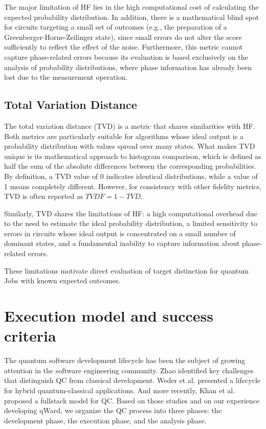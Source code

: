 \documentclass[10pt,conference]{IEEEtran}
\begin{document}
The major limitation of HF \cite{mohapatraBenchmarkingFidelityMetrics_2025} lies in the high computational cost of calculating the expected probability distribution. In addition, there is a mathematical blind spot for circuits targeting a small set of outcomes (e.g., the preparation of a Greenberger-Horne-Zeilinger state), since small errors do not alter the score sufficiently to reflect the effect of the noise. Furthermore, this metric cannot capture phase-related errors because its evaluation is based exclusively on the analysis of probability distributions, where phase information has already been lost due to the measurement operation.

\subsection{Total Variation Distance}

The total variation distance (TVD) \cite{knillBoundsApproximationTotal_1995, bhattacharyyaApproximatingTotalVariation_2023} is a metric that shares similarities with HF. Both metrics are particularly suitable for algorithms whose ideal output is a probability distribution with values spread over many states. What makes TVD unique is its mathematical approach to histogram comparison, which is defined as half the sum of the absolute differences between the corresponding probabilities. By definition, a TVD value of 0 indicates identical distributions, while a value of 1 means completely different. However, for consistency with other fidelity metrics, TVD is often reported as $TVDF = 1 - TVD$.

Similarly, TVD shares the limitations of HF: a high computational overhead due to the need to estimate the ideal probability distribution, a limited sensitivity to errors in circuits whose ideal output is concentrated on a small number of dominant states, and a fundamental inability to capture information about phase-related errors.

These limitations motivate direct evaluation of target distinction for quantum Jobs with known expected outcomes.

\section{Execution model and success criteria}
\label{sec:measuring-success}

The quantum software development lifecycle has been the subject of growing attention in the software engineering community. Zhao \cite{zhaoQuantumSoftwareEngineering_2020} identified key challenges that distinguish QC from classical development. Weder et al. \cite{wederQuantumSoftwareDevelopment_2022} presented a lifecycle for hybrid quantum-classical applications. And more recently, Khan et al. \cite{khanAdvancingQuantumSoftware_2024} proposed a fullstack model for QC. Based on those studies and on our experience developing qWard, we organize the QC process into three phases: the development phase, the execution phase, and the analysis phase.
\end{document}
